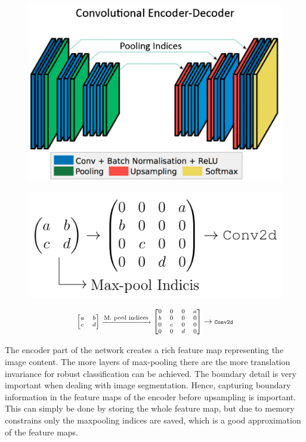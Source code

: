 \documentclass[
]{dtuposter}
\begin{document}
\begin{dtupostercontent}
\begin{figure}
	\centering
	\includegraphics[width=0.8\linewidth]{Structure}
	\caption{}
	\label{fig:Structure}
\end{figure}
 
\begin{figure}
	\centering
	\includegraphics[width=1\linewidth]{pool}
	\label{fig:maxpool}
\end{figure}
\begin{equation*}\label{key}
\scriptsize
\begin{bmatrix}a&b\\c&d\end{bmatrix} \xrightarrow{\text{\scriptsize M. pool indices}}
\begin{bmatrix}0&0&0&a\\b&0&0&0\\0&c&0&0\\0&0&d&0\end{bmatrix} 
\rightarrow 
\texttt{\scriptsize Conv2d}
\end{equation*}

The encoder part of the network creates a rich feature map representing the image content. The more 
layers of max-pooling there are the more translation invariance for robust 
classification can be achieved. The boundary detail is very important when 
dealing with image segmentation. Hence, capturing boundary information in 
the feature maps of the encoder before upsampling is important. This can 
simply be done by storing the whole feature map, but due to memory 
constrains only the maxpooling indices are saved, which is a good 
approximation of the feature maps. 



\end{dtupostercontent}
\end{document}
